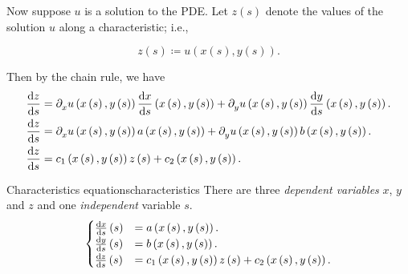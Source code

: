 Now suppose $u$ is a solution to the PDE.
Let $z\left(s\right)$ denote the values of the solution $u$ along a
characteristic; i.e.,

\begin{equation*}
	z
	\left(s\right)\coloneqq
	u
	\left(
	x\left(s\right),
	y\left(s\right)
	\right).
\end{equation*}

Then by the chain rule, we have
\begin{align*}
	\diff{z}{s}
	 & =
	\difcp{u}{x}
	\left(
	x\left(s\right),
	y\left(s\right)
	\right)
	\diff{x}{s}
	\left(
	x\left(s\right),
	y\left(s\right)
	\right)+
	\difcp{u}{y}
	\left(
	x\left(s\right),
	y\left(s\right)
	\right)
	\diff{y}{s}
	\left(
	x\left(s\right),
	y\left(s\right)
	\right). \\
	\diff{z}{s}
	 & =
	\difcp{u}{x}
	\left(
	x\left(s\right),
	y\left(s\right)
	\right)
	a
	\left(
	x\left(s\right),
	y\left(s\right)
	\right)+
	\difcp{u}{y}
	\left(
	x\left(s\right),
	y\left(s\right)
	\right)
	b
	\left(
	x\left(s\right),
	y\left(s\right)
	\right). \\
	\diff{z}{s}
	 & =
	c_{1}
	\left(
	x\left(s\right),
	y\left(s\right)
	\right)
	z
	\left(s\right)+
	c_{2}
	\left(
	x\left(s\right),
	y\left(s\right)
	\right).
\end{align*}

\begin{definition}{Characteristics equations}{characteristics}
	There are three \emph{dependent variables} $x$, $y$ and $z$ and
	one \emph{independent} variable $s$.
	\begin{equation*}
		\begin{cases}
			\diff{x}{s}
			\left(s\right) & =
			a
			\left(
			x\left(s\right),
			y\left(s\right)
			\right).           \\
			\diff{y}{s}
			\left(s\right) & =
			b
			\left(
			x\left(s\right),
			y\left(s\right)
			\right).           \\
			\diff{z}{s}
			\left(s\right) & =
			c_{1}
			\left(
			x\left(s\right),
			y\left(s\right)
			\right)
			z
			\left(s\right)+
			c_{2}
			\left(
			x\left(s\right),
			y\left(s\right)
			\right).
		\end{cases}
	\end{equation*}
\end{definition}

